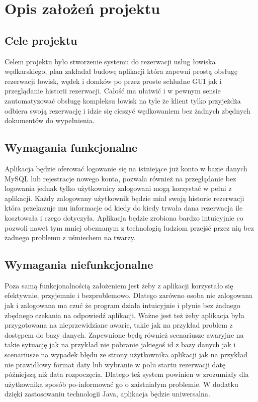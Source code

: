 \chapter{Opis założeń projektu}
\label{chap:opis}


\section{Cele projektu}
Celem projektu było stworzenie systemu do rezerwacji usług łowiska wędkarskiego, plan zakładał budowę aplikacji która zapewni prostą obsługę rezerwacji łowisk, wędek i domków po przez proste schludne GUI jak i przeglądanie historii rezerwacji. Całość ma ułatwić i w pewnym sensie zautomatyzować
obsługę kompleksu łowisk na tyle że klient tylko przyjeżdża odbiera swoją rezerwację i idzie się cieszyć wędkowaniem bez żadnych zbędnych dokumentów do wypełnienia.

\section{Wymagania funkcjonalne}
Aplikacja będzie oferować logowanie się na istniejące już konto w bazie danych MySQL lub rejestracje nowego konta, pozwala również na przeglądanie bez logowania jednak tylko użytkownicy zalogowani mogą korzystać w pełni z aplikacji. Każdy zalogowany użytkownik będzie miał swoją historie rezerwacji która przekazuje mu informacje od kiedy do kiedy trwała dana rezerwacja ile kosztowała i czego dotyczyła. Aplikacja będzie zrobiona bardzo intuicyjnie co pozwoli nawet tym mniej obeznanym z technologią ludziom przejść przez nią bez żadnego problemu z uśmiechem na twarzy.


\section{Wymagania niefunkcjonalne}
Poza samą funkcjonalnością założeniem jest żeby z aplikacji korzystało się efektywnie, przyjemnie i bezproblemowo. Dlatego zarówno osoba nie zalogowana jak i zalogowana ma czuć że program działa intuicyjnie i płynie bez żadnego zbędnego czekania na odpowiedź aplikacji. Ważne jest też żeby aplikacja była przygotowana na nieprzewidziane awarie, takie jak na przykład problem z dostępem do bazy danych. Zapewnione będą również scenariusze awaryjne na takie sytuację jak na przykład nie pobranie jakiegoś id z bazy danych jak i scenariusze na wypadek błędu ze strony użytkownika aplikacji jak na przykład nie prawidłowy format daty lub wybranie w polu startu rezerwacji datę późniejszą niż data rozpoczęcia. Dlatego też system powinien w zrozumiały dla użytkownika sposób po-informować go o zaistniałym problemie. W dodatku dzięki zastosowaniu technologii Java, aplikacja będzie uniwersalna.
